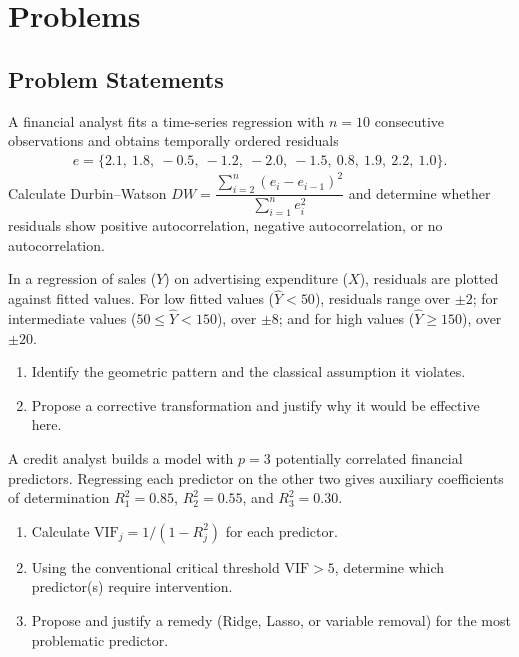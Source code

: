 \section*{Problems}

\subsection*{Problem Statements}

\begin{problema}
\label{prob:c7c2f12}
A financial analyst fits a time-series regression with $n=10$ consecutive observations and obtains temporally ordered residuals
\begin{align}
e=\{2.1,\ 1.8,\ -0.5,\ -1.2,\ -2.0,\ -1.5,\ 0.8,\ 1.9,\ 2.2,\ 1.0\}.
\end{align}
Calculate Durbin--Watson $DW=\dfrac{\sum_{i=2}^n(e_i-e_{i-1})^2}{\sum_{i=1}^n e_i^2}$ and determine whether residuals show positive autocorrelation, negative autocorrelation, or no autocorrelation.
\end{problema}

\begin{problema}
\label{prob:90810fe}
In a regression of sales ($Y$) on advertising expenditure ($X$), residuals are plotted against fitted values. For low fitted values ($\hat Y<50$), residuals range over $\pm2$; for intermediate values ($50\le\hat Y<150$), over $\pm8$; and for high values ($\hat Y\ge150$), over $\pm20$.
\begin{enumerate}
\item Identify the geometric pattern and the classical assumption it violates.
\item Propose a corrective transformation and justify why it would be effective here.
\end{enumerate}
\end{problema}

\begin{problema}
\label{prob:46ca545}
A credit analyst builds a model with $p=3$ potentially correlated financial predictors. Regressing each predictor on the other two gives auxiliary coefficients of determination $R_1^2=0.85$, $R_2^2=0.55$, and $R_3^2=0.30$.
\begin{enumerate}
\item Calculate $\text{VIF}_j=1/(1-R_j^2)$ for each predictor.
\item Using the conventional critical threshold $\text{VIF}>5$, determine which predictor(s) require intervention.
\item Propose and justify a remedy (Ridge, Lasso, or variable removal) for the most problematic predictor.
\end{enumerate}
\end{problema}

